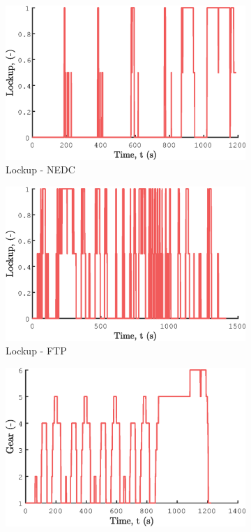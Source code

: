 \begin{figure}[ht]
  \centering
  \begin{subfigure}[b]{0.49\textwidth}
    \includegraphics[width=\textwidth]{figures/model/NEDC/lockup.eps}
    \caption{Lockup - NEDC}
    \label{fig:NEDC_lockup}
  \end{subfigure}
  \begin{subfigure}[b]{0.49\textwidth}
    \includegraphics[width=\textwidth]{figures/model/FTP/lockup.eps}
    \caption{Lockup - FTP}
    \label{fig:FTP_lockup}
  \end{subfigure}
  \begin{subfigure}[b]{0.49\textwidth}
    \includegraphics[width=\textwidth]{figures/model/NEDC/gear.eps}

\end{subfigure}
\end{figure}
